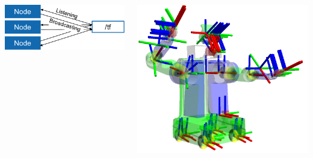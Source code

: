\begin{frame}
\begin{columns}
\begin{column}{0.5\textwidth}
			\includegraphics[width=\columnwidth]{images/tf2_broadcaster_listener.pdf}
		\end{column}
		\begin{column}{0.5\textwidth}
			\includegraphics[width=\columnwidth]{images/tf2_tree_robot.png}
		\end{column}
	\end{columns}

\end{frame}

